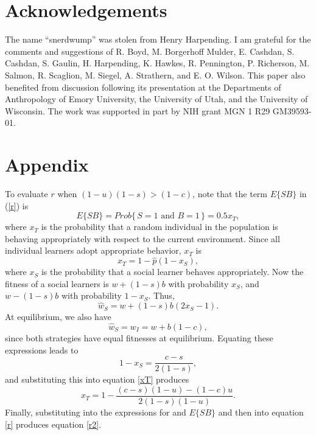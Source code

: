 \documentclass[11pt]{article}
\begin{document}
\section*{Acknowledgements}

The name ``snerdwump'' was stolen from Henry Harpending.  
I am grateful for the comments and suggestions of R. Boyd, M. Borgerhoff
Mulder, E. Cashdan, S.  Cashdan, S. Gaulin, H. Harpending, K. Hawkes, R.
Pennington, P. Richerson, M. Salmon, R. Scaglion, M. Siegel, A. Strathern,
and E. O. Wilson.  This paper also benefited from discussion following its
presentation at the Departments of Anthropology of Emory University, the
University of Utah, and the University of Wisconsin.  The work was
supported in part by NIH grant MGN 1 R29 GM39593-01.
\appendix
\section{Appendix}
To evaluate $r$ when $(1 - u)(1 - s) > (1 - c)$, note that the term
$E\{SB\}$ in (\ref{r}) is 
\[
E\{SB\} = Prob\{\,S = 1 \mbox{ and } B = 1\,\} = 0.5 x_T ,
\]
where $x_T$ is the probability that a random individual in the
population is behaving appropriately with respect to the current
environment.  Since all individual learners adopt appropriate behavior,
$x_T$ is
\begin{equation} \label{xT}
x_T = 1 - \hat{p} (1 - x_S ) ,
\end{equation}
where $x_S$ is the probability that a social learner behaves
appropriately.  Now the fitness of a social learners is $w + (1-s)b$ with
probability $x_S$, and $w - (1-s)b$ with probability $1 - x_S$.  Thus,
\[ \hat{w}_S  = w + (1 - s) b (2 x_S  -  1 ) . \]
At equilibrium, we also have
\[ \hat{w}_S = w_I = w + b(1 - c) , \]
since both strategies have equal fitnesses at equilibrium.  Equating these
expressions leads to
\[ 1 - x_S = \frac{c - s}{2(1 - s)} , \]
and substituting this into equation \ref{xT} produces
\[ x_T = 1 - \frac{(c - s)(1 - u) - (1 - c)u}{2(1 - s)(1 - u)} . \]
Finally, substituting into the expressions for and $E\{SB\}$ and then
into equation \ref{r} produces equation \ref{r2}.
\end{document}
